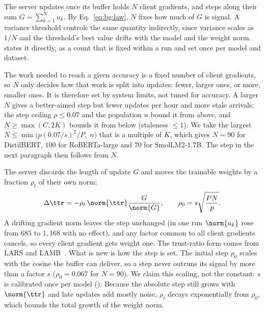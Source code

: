 The server updates once its buffer holds $N$ client gradients, and steps along
their sum $G=\sum_{k=1}^{N}u_k$. By Eq.~\eqref{eq:bg:law}, $N$ fixes how much
of $G$ is signal. A variance threshold controls the same quantity indirectly,
since variance scales as $1/N$ and the threshold's best value drifts with the
model and the weight norm. \sys states it directly, as a count that is fixed
within a run and set once per model and dataset.

The work needed to reach a given accuracy is a fixed number of client
gradients, so $N$ only decides how that work is split into updates: fewer,
larger ones, or more, smaller ones. It is therefore set by system limits, not
tuned for accuracy. A larger $N$ gives a better-aimed step but fewer updates
per hour and more stale arrivals; the step ceiling $\rho\le0.07$ and the
population $n$ bound it from above, and $N\ge\max(C,2K)$ bounds it from below
(staleness $\le1$). We take the largest $N\le\min\!\big(p(0.07/s)^2/P,\;n\big)$
that is a multiple of $K$, which gives $N=90$ for DistilBERT, $100$ for
RoBERTa-large and $70$ for SmolLM2-1.7B. The step in the next paragraph then
follows from $N$.

The server discards the length of update $G$ and moves the trainable weights by a
fraction $\rho_t$ of their own norm:
\begin{equation}
\Delta\ttr=-\rho_t\,\norm{\ttr}\frac{G}{\norm{G}},\qquad
\rho_0=s\sqrt{\frac{PN}{p}} .
\label{eq:ft:step}
\end{equation}
A drifting gradient norm leaves the step unchanged (in one run $\norm{u_k}$
rose from $685$ to $1{,}168$ with no effect), and any factor common to all
client gradients cancels, so every client gradient gets weight one. The
trust-ratio form comes from LARS and LAMB~\cite{you2017lars,you2020lamb}.
What is new is how the step is set. The initial step $\rho_0$ scales with the
cosine the buffer can deliver, so a step never outruns its signal by more than
a factor $s$ ($\rho_0=0.067$ for $N=90$). We claim this scaling, not the
constant: $s$ is calibrated once per model ().
Because the absolute step still grows with $\norm{\ttr}$ and late updates add
mostly noise, $\rho_t$ decays exponentially from $\rho_0$, which bounds the
total growth of the weight norm.

